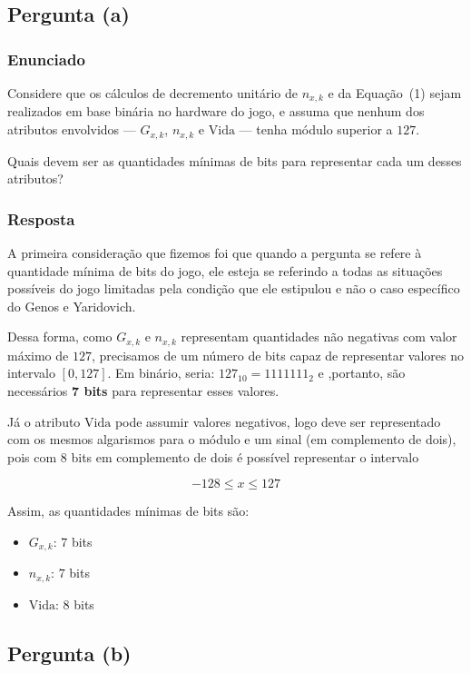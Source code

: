 \documentclass[12pt]{article}
\begin{document}
\subsection{Pergunta (a)}

\subsubsection*{Enunciado}

Considere que os cálculos de decremento unitário de $n_{x,k}$ e da Equação~(1)
sejam realizados em base binária no hardware do jogo, e assuma que nenhum
dos atributos envolvidos --- $G_{x,k}$, $n_{x,k}$ e $\text{Vida}$ --- tenha
módulo superior a $127$.

Quais devem ser as quantidades mínimas de bits para representar cada um
desses atributos?

\subsubsection*{Resposta}
A primeira consideração que fizemos foi que quando a pergunta se refere à quantidade mínima de bits do jogo, ele esteja se referindo a todas as situações possíveis do jogo limitadas pela condição que ele estipulou e não o caso específico do Genos e Yaridovich.

Dessa forma, como $G_{x,k}$ e $n_{x,k}$ representam quantidades não negativas com
valor máximo de $127$, precisamos de um número de bits capaz de
representar valores no intervalo $[0,127]$. Em binário, seria: $127_{10} = 1111111_2$ e ,portanto, são necessários \textbf{7 bits} para representar esses valores.

Já o atributo $\text{Vida}$ pode assumir valores negativos, logo deve ser representado com os mesmos algarismos para o módulo e um sinal (em complemento de dois), pois com $8$ bits em complemento de dois é possível representar o intervalo

\[
-128 \leq x \leq 127
\]

Assim, as quantidades mínimas de bits são:

\begin{itemize}
\item $G_{x,k}$: $7$ bits
\item $n_{x,k}$: $7$ bits
\item $\text{Vida}$: $8$ bits
\end{itemize}

\subsection{Pergunta (b)}
\end{document}
